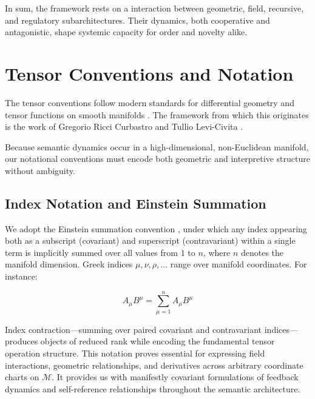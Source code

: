 In sum, the framework rests on a interaction between geometric, field, recursive, and regulatory subarchitectures. Their dynamics, both cooperative and antagonistic, shape systemic capacity for order and novelty alike.


\section{Tensor Conventions and Notation}
\label{2.4:tensor_conventions_and_notation}

The tensor conventions follow modern standards for differential geometry and tensor functions on smooth manifolds \autocite{Lee2012, MisnerThorneWheeler1973}. The framework from which this originates is the work of Gregorio Ricci Curbastro and Tullio Levi-Civita \autocite{RicciLeviCivita1901}.

Because semantic dynamics occur in a high-dimensional, non-Euclidean manifold, our notational conventions must encode both geometric and interpretive structure without ambiguity.

\subsection{Index Notation and Einstein Summation}
\label{2.4.1:index_notation_and_einstein_summation}

We adopt the Einstein summation convention \autocite{Einstein1916}, under which any index appearing both as a subscript (covariant) and superscript (contravariant) within a single term is implicitly summed over all values from \(1\) to \(n\), where \(n\) denotes the manifold dimension. Greek indices \(\mu,\nu,\rho,\ldots\) range over manifold coordinates. For instance:

\begin{equation}
A_\mu B^\mu = \sum_{\mu=1}^n A_\mu B^\mu
\end{equation}

Index contraction—summing over paired covariant and contravariant indices—produces objects of reduced rank while encoding the fundamental tensor operation structure. This notation proves essential for expressing field interactions, geometric relationships, and derivatives across arbitrary coordinate charts on \(\mathcal{M}\). It provides us with manifestly covariant formulations of feedback dynamics and self-reference relationships throughout the semantic architecture.

